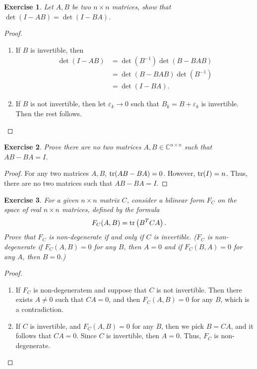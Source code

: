 \documentclass[10pt]{book}
\newtheorem{exercise}{Exercise}[section]
\theoremstyle{definition}
\numberwithin{equation}{chapter}
\begin{document}
\medskip

\begin{exercise}
Let $A, B$ be two $n \times n$ matrices, show that $\det (I - AB) = \det (I - BA)$.
\end{exercise}
\begin{proof}
~\begin{enumerate}[label=(\alph*)]
    \item If $B$ is invertible, then 
    \begin{align*}
        \det (I - AB) & = \det \left(B^{-1}\right) \det (B - BAB) \\
        & = \det (B - BAB) \det \left(B^{-1}\right) \\
        & = \det (I - BA).
    \end{align*}
    
    \item If $B$ is not invertible, then let $\varepsilon_k \to 0$ such that $B_k = B + \varepsilon_k$ is invertible. Then the rest follows.
\end{enumerate}
\end{proof}

\medskip

\begin{exercise}
Prove there are no two matrices $A, B \in \mathbb{C}^{n \times n}$ such that $AB - BA = I${\rm \cite{19}}. 
\end{exercise}
\begin{proof}
For any two matrices $A, B$, ${\rm tr}(AB - BA) = 0$\cite{20}. However, ${\rm tr} (I) = n$. Thus, there are no two matrices such that $AB - BA = I$.
\end{proof}

\medskip

\begin{exercise}{\bf *}
For a given $n \times n$ matrix $C$, consider a bilinear form $F_C$ on the space of real $n \times n$ matrices, defined by the formula 
\begin{align*}
    F_C(A, B) = {\rm tr} \left(B^T C A\right).
\end{align*}
Prove that $F_C$ is non-degenerate if and only if $C$ is invertible. ($F_C$ is non-degenerate if $F_C(A,B) = 0$ for any $B$, then $A = 0$ and if $F_C(B,A) = 0$ for any $A$, then $B = 0$.)
\end{exercise}
\begin{proof}
~\begin{enumerate}[label=(\alph*)]
    \item If $F_C$ is non-degeneratem and suppose that $C$ is not invertible. Then there exists $A \neq 0$ such that $CA = 0$, and then $F_C(A,B) = 0$ for any $B$, which is a contradiction.
    
    \item If $C$ is invertible, and $F_C(A, B) = 0$ for any $B$, then we pick $B = CA$, and it follows that $CA = 0$. Since $C$ is invertible, then $A = 0$. Thus, $F_C$ is non-degenerate.
\end{enumerate}
\end{proof}
\end{document}
